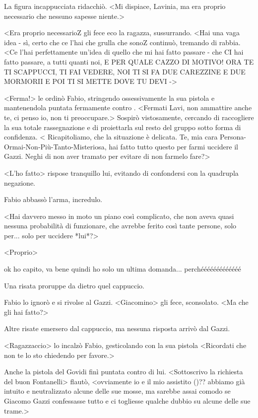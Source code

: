 La figura incappucciata ridacchiò. <Mi dispiace, Lavinia, ma era proprio necessario che nessuno sapesse niente.>

<Era proprio necessarioZ gli fece eco la ragazza, sussurrando. <Hai una vaga idea - sì, certo che ce l'hai che grulla che sonoZ continuò, tremando di rabbia. <Ce l'hai perfettamente un'idea di quello che mi hai fatto passare - che CI hai fatto passare, a tutti quanti noi, E PER QUALE CAZZO DI MOTIVO! ORA TE TI SCAPPUCCI, TI FAI VEDERE, NOI TI SI FA DUE CAREZZINE E DUE MORMORII E POI TI SI METTE DOVE TU DEVI ->

<Ferma!> le ordinò Fabio, stringendo ossessivamente la sua pistola e mantenendola puntata fermamente contro . <Fermati Lavi, non ammattire anche te, ci penso io, non ti preoccupare.> Sospirò vistosamente, cercando di raccogliere la sua totale rassegnazione e di proiettarla sul resto del gruppo sotto forma di confidenza. < Ricapitoliamo, che la situazione è delicata. Te, mia cara Persona-Ormai-Non-Più-Tanto-Misteriosa, hai fatto tutto questo per farmi uccidere il Gazzi. Neghi di non aver tramato per evitare di non farmelo fare?>

<L'ho fatto> rispose tranquillo lui, evitando di confondersi con la quadrupla negazione.

Fabio abbassò l'arma, incredulo.

<Hai davvero messo in moto un piano così complicato, che non aveva quasi nessuna probabilità di funzionare, che avrebbe ferito così tante persone, solo per... solo per uccidere *lui*?>

<Proprio>

ok ho capito, va bene quindi ho solo un ultima domanda...
perchééééééééééééé

Una risata proruppe da dietro quel cappuccio.

Fabio lo ignorò e si rivolse al Gazzi. <Giacomino> gli fece, sconsolato. <Ma che gli hai fatto?>

Altre risate emersero dal cappuccio, ma nessuna risposta arrivò dal Gazzi.

<Ragazzaccio> lo incalzò Fabio, gesticolando con la sua pistola <Ricordati che non te lo sto chiedendo per favore.>

Anche la pistola del Govidi finì puntata contro di lui. <Sottoscrivo la richiesta del buon Fontanelli> flautò, <ovviamente io e il mio assistito ()?? abbiamo già intuito e neutralizzato alcune delle sue mosse, ma sarebbe assai comodo se Giacomo Gazzi confessasse tutto e ci togliesse qualche dubbio su alcune delle sue trame.>

